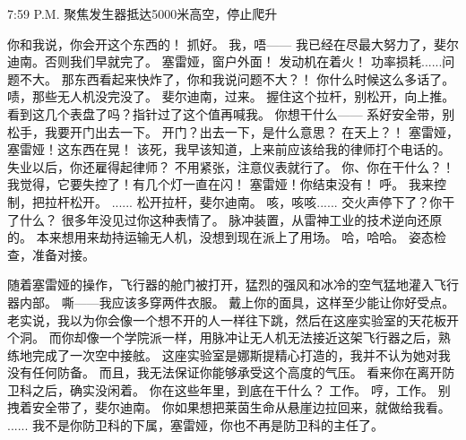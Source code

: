 \documentclass[openany]{book}
\begin{document}
7:59 P.M. 聚焦发生器抵达5000米高空，停止爬升
\begin{dialogue}
     你和我说，你会开这个东西的！
     抓好。
     我，唔——
     我已经在尽最大努力了，斐尔迪南。否则我们早就完了。
     塞雷娅，窗户外面！
     发动机在着火！
     功率损耗......问题不大。
     那东西看起来快炸了，你和我说问题不大？！
     你什么时候这么多话了。
     啧，那些无人机没完没了。
     斐尔迪南，过来。
     握住这个拉杆，别松开，向上推。
     看到这几个表盘了吗？指针过了这个值再喊我。
     你想干什么——
     系好安全带，别松手，我要开门出去一下。
     开门？出去一下，是什么意思？
     在天上？！
     塞雷娅，塞雷娅！这东西在晃！
     该死，我早该知道，上来前应该给我的律师打个电话的。
     失业以后，你还雇得起律师？
     不用紧张，注意仪表就行了。
     你、你在干什么？！
     我觉得，它要失控了！有几个灯一直在闪！
     塞雷娅！你结束没有！
     呼。
     我来控制，把拉杆松开。
     ......
     松开拉杆，斐尔迪南。
     咳，咳咳......
     交火声停下了？你干了什么？
     很多年没见过你这种表情了。
     脉冲装置，从雷神工业的技术逆向还原的。
     本来想用来劫持运输无人机，没想到现在派上了用场。
     哈，哈哈。
     姿态检查，准备对接。\par
    随着塞雷娅的操作，飞行器的舱门被打开，猛烈的强风和冰冷的空气猛地灌入飞行器内部。
     嘶——我应该多穿两件衣服。
     戴上你的面具，这样至少能让你好受点。
     老实说，我以为你会像一个想不开的人一样往下跳，然后在这座实验室的天花板开个洞。
     而你却像一个学院派一样，用脉冲让无人机无法接近这架飞行器之后，熟练地完成了一次空中接舷。
     这座实验室是娜斯提精心打造的，我并不认为她对我没有任何防备。
     而且，我无法保证你能够承受这个高度的气压。
     看来你在离开防卫科之后，确实没闲着。
     你在这些年里，到底在干什么？
     工作。
     哼，工作。
     别拽着安全带了，斐尔迪南。
     你如果想把莱茵生命从悬崖边拉回来，就做给我看。
     ......
     我不是你防卫科的下属，塞雷娅，你也不再是防卫科的主任了。

\end{dialogue}
\end{document}
